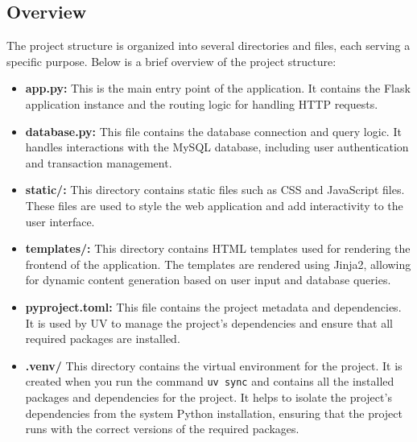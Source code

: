 \subsection{Overview}
The project structure is organized into several directories and files, each serving a
specific purpose. Below is a brief overview of the project structure:
\begin{itemize}
    \item \textbf{app.py:} This is the main entry point of the application. It contains the
    Flask application instance and the routing logic for handling HTTP requests.

    \item \textbf{database.py:} This file contains the database connection and query logic. It
    handles interactions with the MySQL database, including user authentication and transaction
    management.

    \item \textbf{static/:} This directory contains static files such as CSS and JavaScript
    files. These files are used to style the web application and add interactivity to the user
    interface.

    \item \textbf{templates/:} This directory contains HTML templates used for rendering the
    frontend of the application. The templates are rendered using Jinja2, allowing for dynamic
    content generation based on user input and database queries.

    \item \textbf{pyproject.toml:} This file contains the project metadata and dependencies. It is used by
    UV to manage the project's dependencies and ensure that all required packages are installed.

    \item \textbf{.venv/} This directory contains the virtual environment for the project. It is created
    when you run the command \texttt{uv sync} and contains all the installed packages and dependencies
    for the project. It helps to isolate the project's dependencies from the system Python
    installation, ensuring that the project runs with the correct versions of the required packages.
\end{itemize}

